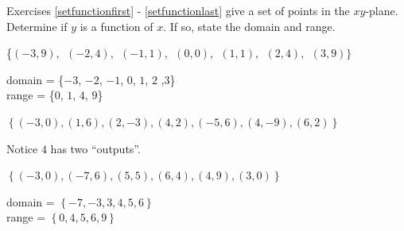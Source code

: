 \documentclass{ximera}
\begin{document}
\begin{question}
Exercises \ref{setfunctionfirst} - \ref{setfunctionlast} give a set of points in the $xy$-plane. Determine if $y$ is a function of $x$. If so, state the
domain and range.

\begin{problem}\label{setfunctionfirst}
\{$(-3, 9)$, $\;(-2, 4)$, $\;(-1, 1)$, $\;(0, 0)$, $\;(1, 1)$, $\;(2, 4)$, $\;(3, 9)\}$ 

\begin{multipleChoice}
    \begin{feedback}
    \begin{solution}
       domain = \{$-3$, $-2$, $-1$, $0$, $1$, $2$ ,$3$\} \\ range = \{$0$, $1$, $4$, $9$\} 
    \end{solution}
    \end{feedback}
\end{multipleChoice}
\end{problem}

\begin{problem}
$\left\{ (-3,0), (1,6), (2,-3), (4,2), (-5,6), (4,-9), (6,2) \right\}$

\begin{multipleChoice}
    \begin{feedback}
       Notice $4$ has two ``outputs''. 
    \end{feedback}
\end{multipleChoice}
\end{problem}   


\begin{problem}
$\left\{ (-3,0), (-7,6), (5,5), (6,4), (4,9), (3,0) \right\}$

\begin{multipleChoice}
    \begin{feedback}
    \begin{solution}
       domain = $\left\{ -7, -3, 3, 4, 5, 6 \right\}$ \\ range = $\left\{ 0,4,5,6,9 \right\}$ 
    \end{solution}
    \end{feedback}
\end{multipleChoice}
\end{problem}    


\end{question}
\end{document}
